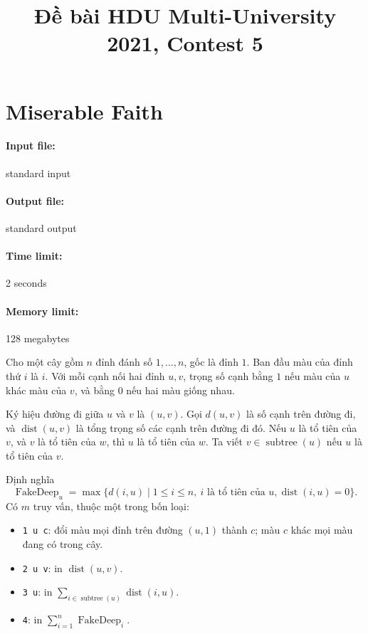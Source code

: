 \documentclass[11pt]{article}
\title{Đề bài HDU Multi-University 2021, Contest 5}
\author{}
\date{}
\begin{document}
\maketitle


\section{Miserable Faith}

\paragraph{Input file:} standard input
\paragraph{Output file:} standard output
\paragraph{Time limit:} 2 seconds
\paragraph{Memory limit:} 128 megabytes

Cho một cây gồm \(n\) đỉnh đánh số \(1,\ldots,n\), gốc là đỉnh \(1\). Ban
đầu màu của đỉnh thứ \(i\) là \(i\). Với mỗi cạnh nối hai đỉnh \(u,v\), trọng
số cạnh bằng \(1\) nếu màu của \(u\) khác màu của \(v\), và bằng \(0\) nếu
hai màu giống nhau.

Ký hiệu đường đi giữa \(u\) và \(v\) là \((u,v)\). Gọi \(d(u,v)\) là số cạnh
trên đường đi, và \(\operatorname{dist}(u,v)\) là tổng trọng số các cạnh trên
đường đi đó. Nếu \(u\) là tổ tiên của \(v\), và \(v\) là tổ tiên của \(w\),
thì \(u\) là tổ tiên của \(w\). Ta viết \(v\in\operatorname{subtree}(u)\) nếu
\(u\) là tổ tiên của \(v\).

Định nghĩa
\[
  \operatorname{FakeDeep}_u=
  \max\{d(i,u)\mid 1\le i\le n,\ i\text{ là tổ tiên của }u,
  \operatorname{dist}(i,u)=0\}.
\]
Có \(m\) truy vấn, thuộc một trong bốn loại:
\begin{itemize}
  \item \texttt{1 u c}: đổi màu mọi đỉnh trên đường \((u,1)\) thành \(c\);
        màu \(c\) khác mọi màu đang có trong cây.
  \item \texttt{2 u v}: in \(\operatorname{dist}(u,v)\).
  \item \texttt{3 u}: in
        \(\sum_{i\in\operatorname{subtree}(u)}\operatorname{dist}(i,u)\).
  \item \texttt{4}: in \(\sum_{i=1}^n\operatorname{FakeDeep}_i\).
\end{itemize}
\end{document}
